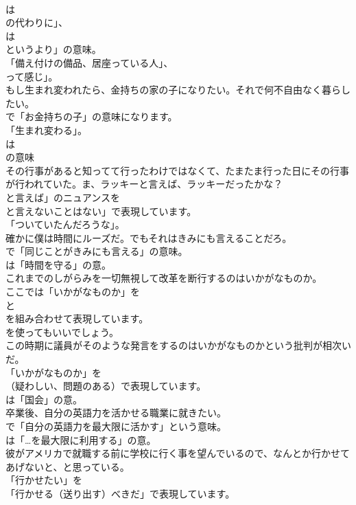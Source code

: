 \documentclass[8pt]{extreport}
\begin{document}
\begin{CJK}{UTF8}{min}
\\	は
\\	の代わりに」、
\\	は
\\	というより」の意味。
\\	「備え付けの備品、居座っている人」、
\\	って感じ」。	
\\	もし生まれ変われたら、金持ちの家の子になりたい。それで何不自由なく暮らしたい。 
\\	で「お金持ちの子」の意味になります。
\\	「生まれ変わる」。
\\	は
\\	の意味	
\\	その行事があると知ってて行ったわけではなくて、たまたま行った日にその行事が行われていた。ま、ラッキーと言えば、ラッキーだったかな？ 
\\	と言えば」のニュアンスを
\\	と言えないことはない」で表現しています。
\\	「ついていたんだろうな」。	
\\	確かに僕は時間にルーズだ。でもそれはきみにも言えることだろ。 
\\	で「同じことがきみにも言える」の意味。
\\	は「時間を守る」の意。	
\\	これまでのしがらみを一切無視して改革を断行するのはいかがなものか。 
\\	ここでは「いかがなものか」を 
\\	と 
\\	を組み合わせて表現しています。
\\	を使ってもいいでしょう。	
\\	この時期に議員がそのような発言をするのはいかがなものかという批判が相次いだ。 
\\	「いかがなものか」を 
\\	（疑わしい、問題のある）で表現しています。
\\	は「国会」の意。	
\\	卒業後、自分の英語力を活かせる職業に就きたい。 
\\	で「自分の英語力を最大限に活かす」という意味。
\\	は「…を最大限に利用する」の意。	
\\	彼がアメリカで就職する前に学校に行く事を望んでいるので、なんとか行かせてあげないと、と思っている。 
\\	「行かせたい」を
\\	「行かせる（送り出す）べきだ」で表現しています。	

\end{CJK}
\end{document}

